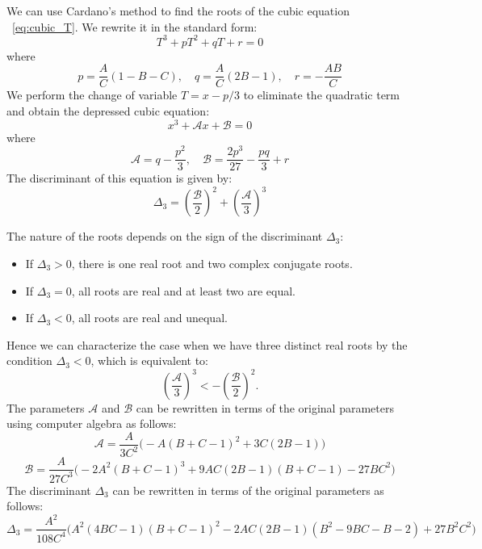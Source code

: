 \documentclass[a4paper, 12pt]{article}
\providecommand{\DIFaddtex}[1]{{\protect\color{blue} \sf #1}} %
\providecommand{\DIFaddbegin}{} %
\providecommand{\DIFaddend}{} %
\providecommand{\DIFadd}[1]{\texorpdfstring{\DIFaddtex{#1}}{#1}} %
\begin{document}
\par\noindent We can use Cardano's method to find the roots of the cubic equation\DIFaddbegin \DIFadd{~}\DIFaddend \eqref{eq:cubic_T}. We rewrite it in the standard form:
\[ T^3 + p T^2 + q T + r = 0
\]
where
\[ p = \frac{A}{C} \left(1- B- C \right), \quad
q = \frac{A}{C} \left(2 B -1 \right), \quad
r = -\frac{A B}{C}
\]
We perform the change of variable $T = x - p/3$ to eliminate the quadratic term and obtain the depressed cubic equation:
\[
x^3 + \mathcal{A} x + \mathcal{B} = 0
\]
where
\[
\mathcal{A} = q - \frac{p^2}{3}, \quad \mathcal{B} = \frac{2 p^3}{27} - \frac{p q}{3} + r
\]
The discriminant of this equation is given by:
\[
\Delta_3 = \DIFaddbegin {\DIFaddend \left(\frac{\mathcal{B}}{2}\right)\DIFaddbegin }\DIFaddend ^2 + \DIFaddbegin {\DIFaddend \left(\frac{\mathcal{A}}{3}\right)\DIFaddbegin }\DIFaddend ^3
\]

The nature of the roots depends on the sign of the discriminant $\Delta_3$:
\begin{itemize}
\item If $\Delta_3 > 0$, there is one real root and two complex conjugate roots.
\item If $\Delta_3 = 0$, all roots are real and at least two are equal.
\item If $\Delta_3 < 0$, all roots are real and unequal.
\end{itemize}
Hence we can characterize the case when we have three distinct real roots by the condition $\Delta_3 < 0$, which is equivalent to:
\[ \DIFaddbegin {\DIFaddend \left(\frac{\mathcal{A}}{3}\right)\DIFaddbegin }\DIFaddend ^3 < - \DIFaddbegin {\DIFaddend \left(\frac{\mathcal{B}}{2}\right)\DIFaddbegin }\DIFaddend ^2.
\]
The parameters $\mathcal{A}$ and $\mathcal{B}$ can be rewritten in terms of the original parameters  using computer algebra as follows:
\[
\mathcal{A}=\frac{A}{ 3 C^2} \Big(-A \DIFaddbegin {\DIFaddend (B + C - 1)\DIFaddbegin }\DIFaddend ^2 + 3 C(2B - 1)\Big)
\]
\[
\mathcal{B}= \frac{A}{27 C^3} \Big(-2A^2 \DIFaddbegin {\DIFaddend (B + C - 1)\DIFaddbegin }\DIFaddend ^3 + 9 A C (2 B - 1)(B + C - 1) - 27 B C^2\Big)
\]
The discriminant $\Delta_3$ can be rewritten in terms of the original parameters as follows:
\[
\Delta_3 = \frac{A^2}{108 C^4} \Bigg(A^2 (4BC-1) \DIFaddbegin {\DIFaddend (B + C - 1)\DIFaddbegin }\DIFaddend ^2 - 2AC (2B-1)(B^2-9BC-B-2) + 27 B^2 C^2\Bigg)
\]
\par\noindent
\end{document}
